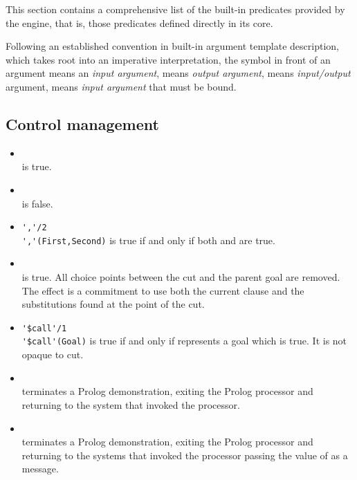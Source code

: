 \noindent This section contains a comprehensive list of the built-in predicates provided by the \tuprolog{} engine, that is, those predicates defined directly in its core.

Following an established convention in built-in argument template description, which takes root into an imperative interpretation, the symbol \bt{+} in front of an argument means an \emph{input argument}, \bt{-} means \emph{output argument},  means \emph{input/output} argument,  means \emph{input argument} that must be bound.

\subsection{Control management}

\begin{itemize}
%
\item {}\\
\noindent{} is true.
%
\item {}\\
\noindent{} is false.
%
\item \verb|','/2|\\
\noindent\verb|','(First,Second)| is true if and only if both 
and  are true.
%
\item {}\\
\noindent\bt{!} is true. All choice points between the cut and the
parent goal are removed. The effect is a commitment to use both the
current clause and the substitutions found at the point of the
cut.
%
\item \verb|'$call'/1|\\
\noindent\verb|'$call'(Goal)| is true if and only if 
represents a goal which is true. It is not opaque to cut.\\
%
\item {}\\
\noindent{} terminates a Prolog demonstration, exiting the
Prolog processor and returning to the system that invoked the
processor.
%
\item {}\\
\noindent{} terminates a Prolog demonstration, exiting
the Prolog processor and returning to the systems that invoked the
processor passing the value of  as a message.\\
%
\end{itemize}

